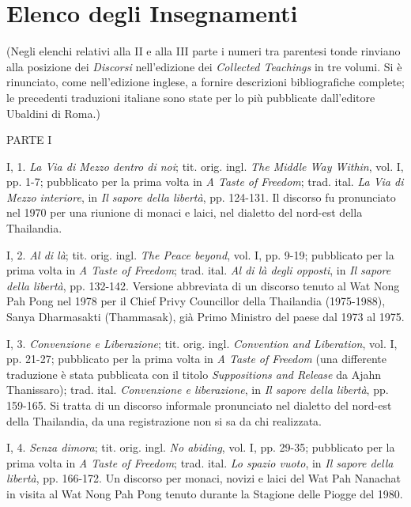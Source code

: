\chapter{Elenco degli Insegnamenti}


(Negli elenchi relativi alla II e alla III parte i numeri
tra parentesi tonde rinviano alla posizione dei \emph{Discorsi} nell'edizione
dei \emph{Collected Teachings} in tre volumi. Si è rinunciato, come
nell'edizione inglese, a fornire descrizioni bibliografiche complete; le
precedenti traduzioni italiane sono state per lo più pubblicate dall'editore
Ubaldini di Roma.)

PARTE I

I, 1. \emph{La Via di Mezzo dentro di noi}; tit. orig. ingl. \emph{The
Middle Way Within}, vol. I, pp. 1-7; pubblicato per la prima volta in
\emph{A Taste of Freedom}; trad. ital. \emph{La Via di Mezzo interiore},
in \emph{Il sapore della libertà}, pp. 124-131. Il discorso fu
pronunciato nel 1970 per una riunione di monaci e laici, nel dialetto
del nord-est della Thailandia.

I, 2. \emph{Al di là}; tit. orig. ingl. \emph{The Peace beyond}, vol. I,
pp. 9-19; pubblicato per la prima volta in \emph{A Taste of Freedom};
trad. ital. \emph{Al di là degli opposti}, in \emph{Il sapore della
libertà}, pp. 132-142. Versione abbreviata di un discorso tenuto al Wat
Nong Pah Pong nel 1978 per il Chief Privy Councillor della Thailandia
(1975-1988), Sanya Dharmasakti (Thammasak), già Primo Ministro del paese
dal 1973 al 1975.

I, 3. \emph{Convenzione e Liberazione}; tit. orig. ingl.
\emph{Convention and Liberation}, vol. I, pp. 21-27; pubblicato per la
prima volta in \emph{A Taste of Freedom} (una differente traduzione è
stata pubblicata con il titolo \emph{Suppositions and Release} da Ajahn
Thanissaro); trad. ital. \emph{Convenzione e liberazione}, in \emph{Il
sapore della libertà}, pp. 159-165. Si tratta di un discorso informale
pronunciato nel dialetto del nord-est della Thailandia, da una
registrazione non si sa da chi realizzata.

I, 4. \emph{Senza dimora}; tit. orig. ingl. \emph{No abiding}, vol. I,
pp. 29-35; pubblicato per la prima volta in \emph{A Taste of Freedom};
trad. ital. \emph{Lo spazio vuoto}, in \emph{Il sapore della libertà},
pp. 166-172. Un discorso per monaci, novizi e laici del Wat Pah Nanachat
in visita al Wat Nong Pah Pong tenuto durante la Stagione delle Piogge
del 1980.

